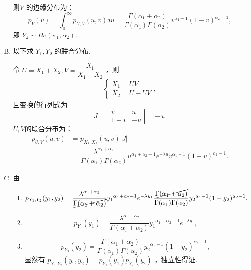 \begin{example}
\begin{enumerate}[A.]
        则$ V$ 的边缘分布为： 
        \[
            p_{V}(v)=\int_0^{\infty} p_{U,V}(u,v)du=\dfrac{\Gamma(\alpha_1+\alpha_2)}{\Gamma(\alpha_1)\Gamma(\alpha_2)}v^{\alpha_1-1}(1-v)^{\alpha_2-1},
        \]
        即 $Y_2 \sim Be(\alpha_1,\alpha_2) .$
        \item 以下求 $Y_1,Y_2$ 的联合分布.

        令 $U=X_1+X_2,V=\dfrac{X_1}{X_1+X_2}$ ，则 
        \[
            \left\{ \begin{array}{ll} X_{1}=UV \\ X_{2}=U-UV \end{array}\right., 
        \]
        且变换的行列式为 
        \[
            J= \left | \begin{array}{ccc} v & u \\ 1-v & -u \end{array} \right |=-u. 
        \]
        $U,V $的联合分布为：
        \[
            \begin{aligned} p_{U,V}(u,v)&=p_{X_1,X_2}(u,v)|J| \\ &=\dfrac{\lambda^{\alpha_1+\alpha_2}}{\Gamma(\alpha_1)\Gamma(\alpha_2)}{u}^{\alpha_1+\alpha_2-1}e^{-\lambda u} {v}^{\alpha_1-1}(1-v)^{\alpha_2-1}. \end{aligned}
        \]
        \item 由
        \begin{enumerate}[a]
            \item
            \[
                p_{Y_1,Y_2}(y_1,y_2)=\dfrac{\lambda^{\alpha_1+\alpha_2}}{\cancel{\Gamma(\alpha_1+\alpha_2)}}{y_1}^{\alpha_1+\alpha_2-1}e^{-\lambda y_1}\dfrac{\cancel{\Gamma(\alpha_1+\alpha_2)}}{\Gamma(\alpha_1)\Gamma(\alpha_2)}{y_2}^{\alpha_1-1}(1-y_2)^{\alpha_2-1},
            \]
            \item 
            \[
                p_{Y_1}(y_1)=\dfrac{\lambda^{\alpha_1+\alpha_2}}{\Gamma(\alpha_1+\alpha_2)}{y_1}^{\alpha_1+\alpha_2-1}e^{-\lambda y_1}, 
            \] 
            \item  
            \[
                p_{Y_2}(y_2)=\dfrac{\Gamma(\alpha_1+\alpha_2)}{\Gamma(\alpha_1)\Gamma(\alpha_2)}{y_2}^{\alpha_1-1}(1-{y_2})^{\alpha_2-1},
            \]
            显然有 $p_{Y_1,Y_2}(y_1,y_2)=p_{Y_1}(y_1)p_{Y_2}(y_2)$ ，独立性得证.
        \end{enumerate}
    \end{enumerate}
    

\end{example}
